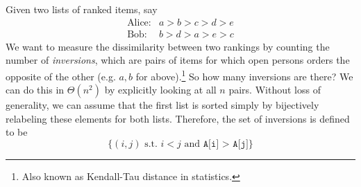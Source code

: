   \begin{definition}[Inversions]
    Given two lists of ranked items, say 
    \begin{align}
      \text{Alice}: & a > b > c > d > e \\
      \text{Bob}: & b > d > a > e > c
    \end{align}
    We want to measure the dissimilarity between two rankings by counting the number of \textit{inversions}, which are pairs of items for which open persons orders the opposite of the other (e.g. $a, b$ for above).\footnote{Also known as Kendall-Tau distance in statistics.} So how many inversions are there? We can do this in $\Theta(n^2)$ by explicitly looking at all $n$ pairs. Without loss of generality, we can assume that the first list is sorted simply by bijectively relabeling these elements for both lists. Therefore, the set of inversions is defined to be 
    \begin{equation}
      \{(i, j) \text{ s.t. } i < j \text{ and } \texttt{A[i] > A[j]}\}
    \end{equation}
  \end{definition}

